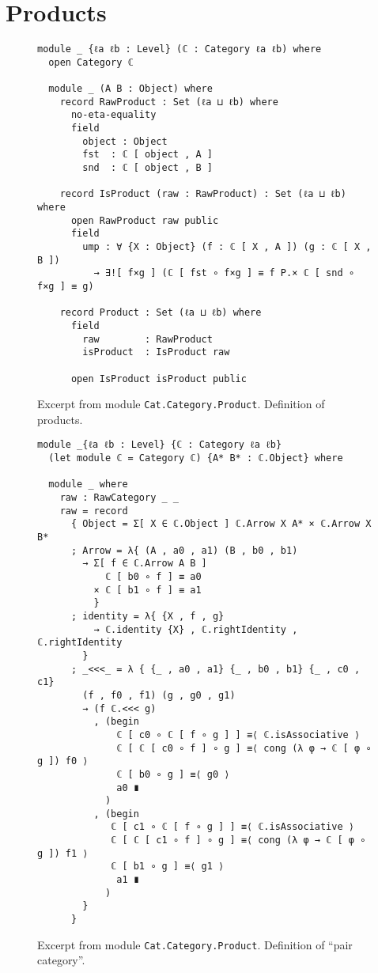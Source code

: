 \section{Products}
\label{sec:app-products}
\begin{figure}[h]
\begin{Verbatim}
module _ {ℓa ℓb : Level} (ℂ : Category ℓa ℓb) where
  open Category ℂ

  module _ (A B : Object) where
    record RawProduct : Set (ℓa ⊔ ℓb) where
      no-eta-equality
      field
        object : Object
        fst  : ℂ [ object , A ]
        snd  : ℂ [ object , B ]

    record IsProduct (raw : RawProduct) : Set (ℓa ⊔ ℓb) where
      open RawProduct raw public
      field
        ump : ∀ {X : Object} (f : ℂ [ X , A ]) (g : ℂ [ X , B ])
          → ∃![ f×g ] (ℂ [ fst ∘ f×g ] ≡ f P.× ℂ [ snd ∘ f×g ] ≡ g)

    record Product : Set (ℓa ⊔ ℓb) where
      field
        raw        : RawProduct
        isProduct  : IsProduct raw

      open IsProduct isProduct public

\end{Verbatim}
\caption{Excerpt from module \texttt{Cat.Category.Product}. Definition of products.}
\end{figure}
%
\begin{figure}[h]
\begin{Verbatim}
module _{ℓa ℓb : Level} {ℂ : Category ℓa ℓb}
  (let module ℂ = Category ℂ) {A* B* : ℂ.Object} where

  module _ where
    raw : RawCategory _ _
    raw = record
      { Object = Σ[ X ∈ ℂ.Object ] ℂ.Arrow X A* × ℂ.Arrow X B*
      ; Arrow = λ{ (A , a0 , a1) (B , b0 , b1)
        → Σ[ f ∈ ℂ.Arrow A B ]
            ℂ [ b0 ∘ f ] ≡ a0
          × ℂ [ b1 ∘ f ] ≡ a1
          }
      ; identity = λ{ {X , f , g}
          → ℂ.identity {X} , ℂ.rightIdentity , ℂ.rightIdentity
        }
      ; _<<<_ = λ { {_ , a0 , a1} {_ , b0 , b1} {_ , c0 , c1}
        (f , f0 , f1) (g , g0 , g1)
        → (f ℂ.<<< g)
          , (begin
              ℂ [ c0 ∘ ℂ [ f ∘ g ] ] ≡⟨ ℂ.isAssociative ⟩
              ℂ [ ℂ [ c0 ∘ f ] ∘ g ] ≡⟨ cong (λ φ → ℂ [ φ ∘ g ]) f0 ⟩
              ℂ [ b0 ∘ g ] ≡⟨ g0 ⟩
              a0 ∎
            )
          , (begin
             ℂ [ c1 ∘ ℂ [ f ∘ g ] ] ≡⟨ ℂ.isAssociative ⟩
             ℂ [ ℂ [ c1 ∘ f ] ∘ g ] ≡⟨ cong (λ φ → ℂ [ φ ∘ g ]) f1 ⟩
             ℂ [ b1 ∘ g ] ≡⟨ g1 ⟩
              a1 ∎
            )
        }
      }
\end{Verbatim}
\caption{Excerpt from module \texttt{Cat.Category.Product}. Definition of ``pair category''.}
\end{figure}
\clearpage

